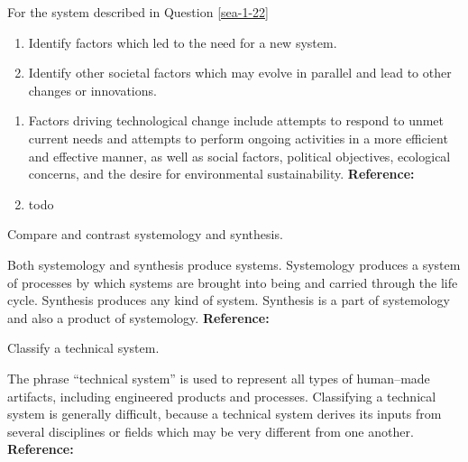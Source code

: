 \begin{exercises}
    \begin{exercise} 
    \label{sea-1-25}
        For the system described in Question \ref{sea-1-22}
        \begin{enumerate}[label=\alph*)]
            \item Identify factors which led to the need for a new system.
            \item Identify other societal factors which may evolve in parallel and lead to other changes or innovations.
        \end{enumerate}
    \end{exercise}
    \begin{solution}
        \begin{enumerate}[label=\alph*)]
            \item Factors driving technological change include attempts to respond to unmet current needs and attempts to perform ongoing activities in a more efficient and effective manner, as well as social factors, political objectives, ecological concerns, and the desire for environmental sustainability. \textbf{Reference:}
            \item todo
        \end{enumerate}
    \end{solution}
    
    \begin{exercise} 
    \label{sea-1-23}
        Compare and contrast systemology and synthesis.
    \end{exercise}
    \begin{solution}
        Both systemology and synthesis produce systems. Systemology produces a system of processes by which systems are brought into being and carried through the life cycle. Synthesis produces any kind of system. Synthesis is a part of systemology and also a product of systemology. \textbf{Reference:}
    \end{solution}
    
    \begin{exercise} 
    \label{sea-1-24}
        Classify a technical system.
    \end{exercise}
    \begin{solution}
        The phrase “technical system” is used to represent all types of human–made artifacts, including engineered products and processes. Classifying a technical system is generally difficult, because a technical system derives its inputs from several disciplines or fields which may be very different from one another. \textbf{Reference:}
    \end{solution}
    

\end{exercises}
